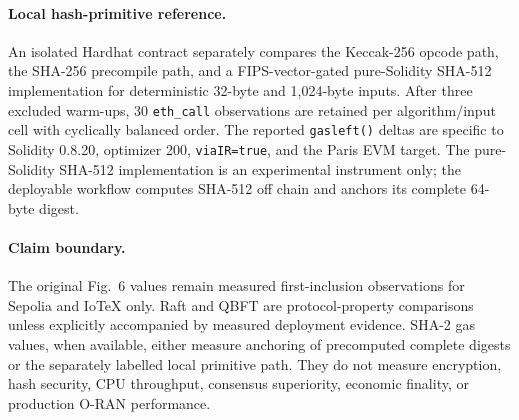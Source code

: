 \paragraph{Local hash-primitive reference.}
An isolated Hardhat contract separately compares the Keccak-256 opcode path,
the SHA-256 precompile path, and a FIPS-vector-gated pure-Solidity SHA-512
implementation for deterministic 32-byte and 1,024-byte inputs. After three
excluded warm-ups, 30 \texttt{eth\_call} observations are retained per
algorithm/input cell with cyclically balanced order. The reported
\texttt{gasleft()} deltas are specific to Solidity 0.8.20, optimizer 200,
\texttt{viaIR=true}, and the Paris EVM target. The pure-Solidity SHA-512
implementation is an experimental instrument only; the deployable workflow
computes SHA-512 off chain and anchors its complete 64-byte digest.



\paragraph{Claim boundary.}
The original Fig.~6 values remain measured first-inclusion observations for
Sepolia and IoTeX only. Raft and QBFT are protocol-property comparisons unless
explicitly accompanied by measured deployment evidence. SHA-2 gas values, when
available, either measure anchoring of precomputed complete digests or the
separately labelled local primitive path. They do not measure encryption, hash
security, CPU throughput, consensus superiority, economic finality, or
production O-RAN performance.
